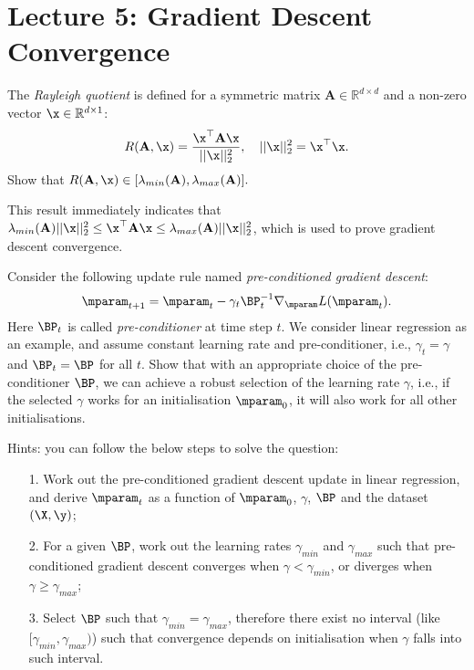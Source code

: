 \section{Lecture 5: Gradient Descent Convergence}

\newcommand{\BA}{\mathbf A}

\begin{question}
\label{q:rayleigh_quotient}
The \emph{Rayleigh quotient} is defined for a symmetric matrix $\BA \in \mathbb{R}^{d \times d}$ and a non-zero vector $\x \in \mathbb{R}^{d \times 1}$:
\begin{equation*}
R(\BA, \x) = \frac{\x^\top \BA \x}{|| \x ||_2^2}, \quad || \x ||_2^2 = \x^\top \x.
\end{equation*}
Show that
$R(\BA, \x) \in [\lambda_{min}(\BA), \lambda_{max}(\BA)].$

This result immediately indicates that $\lambda_{min}(\BA) || \x ||_2^2 \leq \x^\top \BA \x \leq \lambda_{max}(\BA) || \x ||_2^2$, which is used to prove gradient descent convergence.
\end{question}


\begin{question}
\label{q:pre_conditioned_gd}
Consider the following update rule named \emph{pre-conditioned gradient descent}:
$$\mparam_{t+1} = \mparam_t - \gamma_t \BP_t^{-1} \nabla_{\mparam} L(\mparam_t).$$
Here $\BP_t$ is called \emph{pre-conditioner} at time step $t$. We consider linear regression as an example, and assume constant learning rate and pre-conditioner, i.e., $\gamma_t = \gamma$ and $\BP_t = \BP$ for all $t$. 
%
Show that with an appropriate choice of the pre-conditioner $\BP$, we can achieve a robust selection of the learning rate $\gamma$, i.e., if the selected $\gamma$ works for an initialisation $\mparam_0$, it will also work for all other initialisations.

Hints: you can follow the below steps to solve the question:
\begin{itemize}
    \item[1.] Work out the pre-conditioned gradient descent update in linear regression, and derive $\mparam_t$ as a function of $\mparam_0$, $\gamma$, $\BP$ and the dataset $(\X, \y)$;
    \item[2.] For a given $\BP$, work out the learning rates $\gamma_{min}$ and $\gamma_{max}$ such that pre-conditioned gradient descent converges when $\gamma < \gamma_{min}$, or diverges when $\gamma \geq \gamma_{max}$;
    \item[3.] Select $\BP$ such that $\gamma_{min} = \gamma_{max}$, therefore there exist no interval (like $[\gamma_{min}, \gamma_{max})$) such that convergence depends on initialisation when $\gamma$ falls into such interval.
\end{itemize}
\end{question}


